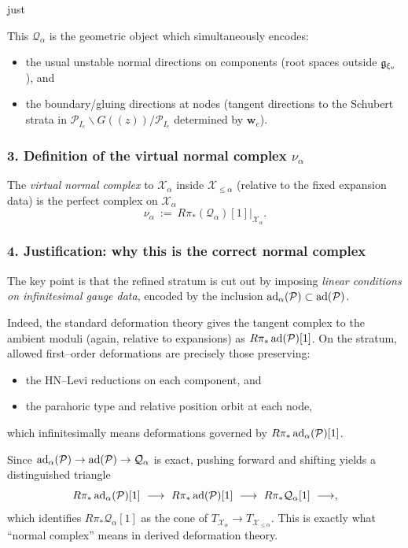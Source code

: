 just \documentclass[12pt]{article}
\begin{document}
This $\mathcal Q_\alpha$ is the geometric object which simultaneously encodes:
\begin{itemize}
\item the usual unstable normal directions on components (root spaces outside $\mathfrak{g}_{\xi_v}$), and
\item the boundary/gluing directions at nodes (tangent directions to the Schubert
strata in $\mathcal P_{I_e}\backslash G((z))/\mathcal P_{I_e}$ determined by $\mathbf w_e$).
\end{itemize}

\subsubsection*{3. Definition of the virtual normal complex $\nu_\alpha$}

\begin{definition}
\label{def:virtual-normal-alpha}
The \emph{virtual normal complex} to $\mathcal X_\alpha$ inside $\mathcal X_{\le\alpha}$
(relative to the fixed expansion data) is the perfect complex on $\mathcal X_\alpha$
\[
\nu_\alpha \ :=\ R\pi_*(\mathcal Q_\alpha)[1]\Big|_{\mathcal X_\alpha}.
\]
\end{definition}

\subsubsection*{4. Justification: why this is the correct normal complex}

The key point is that the refined stratum is cut out by imposing
\emph{linear conditions on infinitesimal gauge data}, encoded by the inclusion
$\operatorname{ad}_\alpha(\mathcal P)\subset \operatorname{ad}(\mathcal P)$.

Indeed, the standard deformation theory gives the tangent complex to the ambient
moduli (again, relative to expansions) as $R\pi_*\operatorname{ad}(\mathcal P)[1]$.  On the stratum,
allowed first--order deformations are precisely those preserving:
\begin{itemize}
\item the HN--Levi reductions on each component, and
\item the parahoric type and relative position orbit at each node,
\end{itemize}
which infinitesimally means deformations governed by $R\pi_*\operatorname{ad}_\alpha(\mathcal P)[1]$.

Since $\operatorname{ad}_\alpha(\mathcal P)\to\operatorname{ad}(\mathcal P)\to\mathcal Q_\alpha$ is exact,
pushing forward and shifting yields a distinguished triangle
\[
R\pi_*\operatorname{ad}_\alpha(\mathcal P)[1]
\ \longrightarrow\
R\pi_*\operatorname{ad}(\mathcal P)[1]
\ \longrightarrow\
R\pi_*\mathcal Q_\alpha[1]
\ \longrightarrow,
\]
which identifies $R\pi_*\mathcal Q_\alpha[1]$ as the cone of
$T_{\mathcal X_\alpha}\to T_{\mathcal X_{\le\alpha}}$.
This is exactly what ``normal complex'' means in derived deformation theory.
\end{document}
